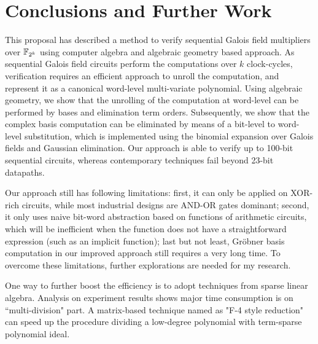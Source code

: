 \section{Conclusions and Further Work}\label{sec:concl}

This proposal has described a method to verify sequential Galois field
multipliers over ${\mathbb{F}}_{2^k}$ using computer algebra and algebraic geometry
based approach. As sequential Galois field circuits perform the
computations over $k$ clock-cycles, verification requires an efficient
approach to unroll the computation, and represent it as a canonical
word-level multi-variate polynomial. Using algebraic geometry, we show
that the unrolling of the computation at word-level can be performed by
\Grobner bases and elimination term orders. Subsequently, we show
that the complex \Grobner basis computation can be eliminated by means
of a bit-level to word-level substitution, which is implemented using
the binomial expansion over Galois fields and Gaussian
elimination. Our approach is able to verify up to 100-bit sequential
circuits, whereas contemporary techniques fail beyond 23-bit
datapaths.  

Our approach still has following limitations: first, it can only be applied
on XOR-rich circuits, while most industrial designs are AND-OR gates dominant;
second, it only uses naive bit-word abstraction based on functions of arithmetic
circuits, which will be inefficient when the function does not have a straightforward
expression (such as an implicit function); last but not least, Gr\"obner basis computation
in our improved approach still requires a very long time. To overcome these limitations,
further explorations are needed for my research. 

One way to further boost the efficiency is to adopt techniques from sparse linear algebra.
Analysis on experiment results shows major time consumption is on ``multi-division" part.
A matrix-based technique named as "F-4 style reduction" \cite{f4} can speed up the procedure
dividing a low-degree polynomial with term-sparse polynomial ideal. 